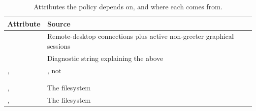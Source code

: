 \begin{table}[H]
\centering
\begin{tabularx}{\textwidth}{L{0.30\textwidth} Y}
\toprule
\textbf{Attribute} & \textbf{Source} \\
\midrule
{} & Remote-desktop connections plus active non-greeter graphical sessions \\
 & Diagnostic string explaining the above \\
,  &  , not  \\
 &  \\
 &  \\
,  & The  filesystem \\
,  & The  filesystem \\
\bottomrule
\end{tabularx}
\caption{Attributes the policy depends on, and where each comes from.}
\end{table}
